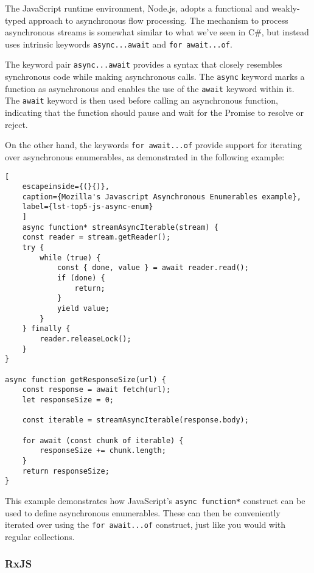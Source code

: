 The JavaScript runtime environment, Node.js, adopts a functional and weakly-typed approach to asynchronous flow processing. The mechanism to process asynchronous streams is somewhat similar to what we've seen in C\#, but instead uses intrinsic keywords \texttt{async...await} and \texttt{for await...of}.

The keyword pair \texttt{async...await} provides a syntax that closely resembles synchronous code while making asynchronous calls. The \texttt{async} keyword marks a function as asynchronous and enables the use of the \texttt{await} keyword within it. The \texttt{await} keyword is then used before calling an asynchronous function, indicating that the function should pause and wait for the Promise to resolve or reject.

On the other hand, the keywords \texttt{for await...of} provide support for iterating over asynchronous enumerables, as demonstrated in the following example:

\begin{center}
	\lstset{basicstyle=\scriptsize\ttfamily,frame=bottomline}
	\centering
	\begin{lstlisting}[
	escapeinside={(}{)},
	caption={Mozilla's Javascript Asynchronous Enumerables example},
	label={lst-top5-js-async-enum}
	]
	async function* streamAsyncIterable(stream) {
    const reader = stream.getReader();
    try {
        while (true) {
            const { done, value } = await reader.read();
            if (done) {
                return;
            }
            yield value;
        }
    } finally {
        reader.releaseLock();
    }
}

async function getResponseSize(url) {
    const response = await fetch(url);
    let responseSize = 0;

    const iterable = streamAsyncIterable(response.body);

    for await (const chunk of iterable) {
        responseSize += chunk.length;
    }
    return responseSize;
}
		\end{lstlisting}
	\end{center}

This example demonstrates how JavaScript's \texttt{async function*} construct can be used to define asynchronous enumerables. These can then be conveniently iterated over using the \texttt{for await...of} construct, just like you would with regular collections.


\subsubsection{RxJS}
\label{rxjs}

